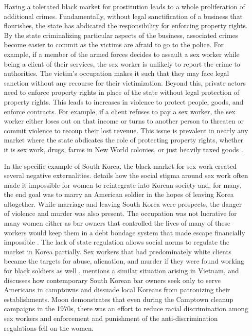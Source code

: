 Having a tolerated black market for prostitution leads to a whole proliferation of additional crimes. Fundamentally, without legal sanctification of a business that flourishes, the state has abdicated the responsibility for enforcing property rights. By the state criminalizing particular aspects of the business, associated crimes become easier to commit as the victims are afraid to go to the police. For example, if a member of the armed forces decides to assault a sex worker while being a client of their services, the sex worker is unlikely to report the crime to authorities. The victim's occupation makes it such that they may face legal sanction without any recourse for their victimization. Beyond this, private actors need to enforce property rights in place of the state without legal protection of property rights. This leads to increases in violence to protect people, goods, and enforce contracts. For example, if a client refuses to pay a sex worker, the sex worker either loses out on that income or turns to another person to threaten or commit violence to recoup their lost revenue. This issue is prevalent in nearly any market where the state abdicates the role of protecting property rights, whether it is sex work, drugs, farms in New World colonies, or just heavily taxed goods \cite{Resignato2000,Fleenor2003,Reynolds2010,Vandusky2011}. 

In the specific example of South Korea, the black market for sex work created several negative externalities.  details how the social stigma around sex work often made it impossible for women to reintegrate into Korean society and, for many, the end goal was to marry an American soldier in the hopes of leaving Korea altogether. While marriage and leaving South Korea were prospects, the danger of violence and murder was also present. The occupation was not lucrative for many women either as bar owners that controlled the lives of many of these workers would keep them in a debt bondage system that made escape financially impossible \cite{Moon1997,Gillem2007}. The lack of state regulation allows social norms to regulate the market in Korea partially. Sex workers that had predominately white clients became the targets for abuse, alienation, and murder if they were found working for black soldiers as well \cite{Moon1997}.  mentions a similar situation arising in Vietnam, and  discusses how contemporary South Korean bar owners seek only to serve Americans in camptowns and dissuade local Koreans from patronizing their establishments. Moon demonstrates that even during the Camptown cleanup campaigns in the 1970s, there was an effort to reduce racial discrimination among sex workers and enforcement and punishment of the anti-discrimination regulations fell on the women. 

